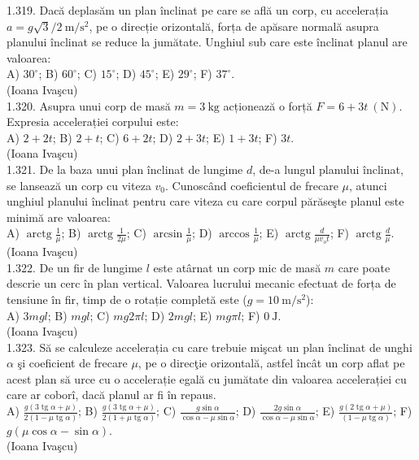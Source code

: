 1.319. Dacă deplasăm un plan înclinat pe care se află un corp, cu accelerația $a=g \sqrt{3} / 2 \mathrm{~m} / \mathrm{s}^{2}$, pe o direcție orizontală, forța de apăsare normală asupra planului înclinat se reduce la jumătate. Unghiul sub care este înclinat planul are valoarea:\\ A) $30^{\circ}$; B) $60^{\circ}$; C) $15^{\circ}$; D) $45^{\circ}$; E) $29^{\circ}$; F) $37^{\circ}$.\\ (Ioana Ivaşcu)\\

1.320. Asupra unui corp de masă $m=3 \mathrm{~kg}$ acționează o forță $F=6+3 t \mathrm{~(N)}$. Expresia accelerației corpului este:\\ A) $2+2 t$; B) $2+t$; C) $6+2 t$; D) $2+3 t$; E) $1+3 t$; F) $3 t$.\\ (Ioana Ivaşcu)\\

1.321. De la baza unui plan înclinat de lungime $d$, de-a lungul planului înclinat, se lansează un corp cu viteza $v_{0}$. Cunoscând coeficientul de frecare $\mu$, atunci unghiul planului înclinat pentru care viteza cu care corpul părăseşte planul este minimă are valoarea:\\ A) $\operatorname{arctg} \frac{1}{\mu}$; B) $\operatorname{arctg} \frac{1}{2 \mu}$; C) $\arcsin \frac{1}{\mu}$; D) $\arccos \frac{1}{\mu}$; E) $\operatorname{arctg} \frac{d}{\mu v_{o} t}$; F) $\operatorname{arctg} \frac{d}{\mu}$.\\ (Ioana Ivaşcu)\\

1.322. De un fir de lungime $l$ este atârnat un corp mic de masă $m$ care poate descrie un cerc în plan vertical. Valoarea lucrului mecanic efectuat de forța de tensiune în fir, timp de o rotație completă este ($g=10 \mathrm{~m} / \mathrm{s}^{2}$):\\ A) $3 m g l$; B) $m g l$; C) $m g 2 \pi l$; D) $2 m g l$; E) $m g \pi l$; F) $0 \mathrm{~J}$.\\ (Ioana Ivaşcu)\\

1.323. Să se calculeze accelerația cu care trebuie mişcat un plan înclinat de unghi $\alpha$ şi coeficient de frecare $\mu$, pe o direcţie orizontală, astfel încât un corp aflat pe acest plan să urce cu o accelerație egală cu jumătate din valoarea accelerației cu care ar coborî, dacă planul ar fi în repaus.\\ A) $\frac{g(3 \operatorname{tg} \alpha+\mu)}{2(1-\mu \operatorname{tg} \alpha)}$; B) $\frac{g(3 \operatorname{tg} \alpha+\mu)}{2(1+\mu \operatorname{tg} \alpha)}$; C) $\frac{g \sin \alpha}{\cos \alpha-\mu \sin \alpha}$; D) $\frac{2 g \sin \alpha}{\cos \alpha-\mu \sin \alpha}$; E) $\frac{g(2 \operatorname{tg} \alpha+\mu)}{(1-\mu \operatorname{tg} \alpha)}$; F) $g(\mu \cos \alpha-\sin \alpha)$.\\ (Ioana Ivaşcu)\\

